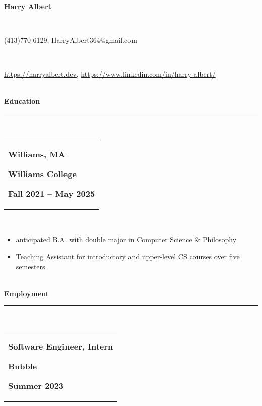 \documentclass[10pt]{extarticle}
\begin{document}
\thispagestyle{empty}
\vspace{-\baselineskip}
\begin{center}
\Large \textbf{Harry Albert }
\end{center}
\vspace{-6.5ex}~\\ 
\vspace{-\baselineskip}
\begin{center}
\normalsize (413)770-6129, HarryAlbert364@gmail.com 
\end{center}
\vspace{-6ex}~\\ 
\vspace{-\baselineskip}
\begin{center}
\normalsize \url{https://harryalbert.dev}, \url{https://www.linkedin.com/in/harry-albert/} 
\end{center}
\vspace{-6ex}~\\ 
\textbf{Education }\\[-2ex]
\rule{\textwidth}{0.4pt}\\ 
\begin{tabular}{@{}p{\textwidth}}\begin{minipage}[t]{0.333\textwidth}
\raggedright
\textbf{Williams, MA}
\end{minipage}%
\begin{minipage}[t]{0.333\textwidth}
\centering
\textbf{\underline{Williams College}}
\end{minipage}%
\begin{minipage}[t]{0.333\textwidth}
\raggedleft
\textbf{Fall 2021 – May 2025}
\end{minipage}%
\end{tabular}\\[0.5ex]
\vspace{-\baselineskip}
\begin{itemize}[itemsep=0pt, topsep=0pt]
\item anticipated B.A. with double major in Computer Science \& Philosophy 
\item Teaching Assistant for introductory and upper-level CS courses over five semesters 
\end{itemize}~\\[-1ex]
\textbf{Employment}\\[-2ex]
\rule{\textwidth}{0.4pt}\\ 
\begin{tabular}{@{}p{\textwidth}}\begin{minipage}[t]{0.333\textwidth}
\raggedright
\textbf{Software Engineer, Intern}
\end{minipage}%
\begin{minipage}[t]{0.333\textwidth}
\centering
\textbf{\underline{Bubble}}
\end{minipage}%
\begin{minipage}[t]{0.333\textwidth}
\raggedleft
\textbf{Summer 2023}
\end{minipage}%
\end{tabular}\\[0.5ex]
\end{document}
